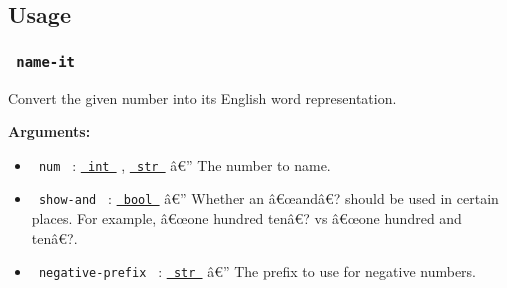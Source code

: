 \begin{Shaded}
\begin{Highlighting}[]


\end{Highlighting}
\end{Shaded}

\subsection{Usage}\label{usage}

\subsubsection{\texorpdfstring{\texttt{\ name-it\ }}{ name-it }}\label{name-it-1}

Convert the given number into its English word representation.

\begin{Shaded}
\begin{Highlighting}[]
\end{Highlighting}
\end{Shaded}

\textbf{Arguments:}

\begin{itemize}
\tightlist
\item
  \texttt{\ num\ } :
  \href{https://typst.app/docs/reference/foundations/int/}{\texttt{\ int\ }}
  ,
  \href{https://typst.app/docs/reference/foundations/str/}{\texttt{\ str\ }}
  â€'' The number to name.
\item
  \texttt{\ show-and\ } :
  \href{https://typst.app/docs/reference/foundations/bool/}{\texttt{\ bool\ }}
  â€'' Whether an â€œandâ€? should be used in certain places. For
  example, â€œone hundred tenâ€? vs â€œone hundred and tenâ€?.
\item
  \texttt{\ negative-prefix\ } :
  \href{https://typst.app/docs/reference/foundations/str/}{\texttt{\ str\ }}
  â€'' The prefix to use for negative numbers.
\end{itemize}

